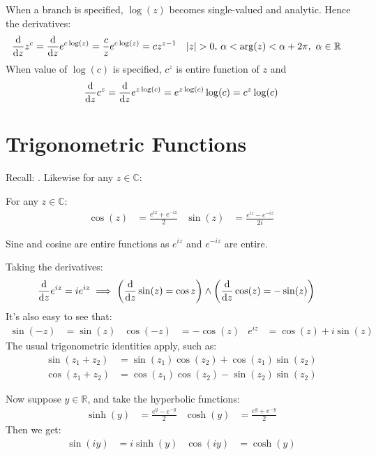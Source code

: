 \documentclass[12pt, english]{book}
\begin{document}
	When a branch is specified, \(\log(z)\) becomes single-valued and analytic. Hence the derivatives: 
	\begin{align*}
		\dv{z} z^c &= \dv{z} e^{c\log(z)} = \frac{c}{z} e^{c \log(z)} = cz^{z-1}
		& \abs{z}>0,& \ \alpha < \arg(z) < \alpha + 2 \pi, \ \alpha \in \mathbb{R}
	\end{align*}
	When value of \(\log(c)\) is specified, \(c^z\) is entire function of \(z\) and
	\begin{align*}
		\dv{z}c^z = \dv{z}e^{z\log(c)} = e^{z\log(c)} \log(c) = c^z \log(c)
	\end{align*}
	
	\section{Trigonometric Functions} \label{Trigonometric Functions Section - Complex}
	
	Recall: . Likewise for any \(z \in \mathbb{C}\):
	
	\begin{definition}
		 
		\label{Sine and Cosine Functions - Complex}
		For any \(z \in \mathbb{C}\):
		\begin{align*}
			\cos(z) &= \frac{e^{iz} + e^{-iz}}{2} &
			\sin(z) &= \frac{e^{iz} - e^{-iz}}{2i} 
		\end{align*}
	\end{definition}
	Sine and cosine are entire functions as \(e^{iz}\) and \(e^{-iz}\) are entire.
	
	Taking the derivatives:
	\begin{align*}
		\dv{z} e^{iz} = ie^{iz}
		&\implies \left(\dv{z} \sin(z) = \cos{z} \right) \land \left( \dv{z} \cos(z) = -\sin(z)\right)
	\end{align*}
	It's also easy to see that:
	\begin{align*}
		\sin(-z) &= \sin(z)  & \cos(-z) &= -\cos(z) & e^{iz} &= \cos(z) + i\sin(z)
	\end{align*}
	The usual trigonometric identities apply, such as: 
	\begin{align*}
		\sin(z_1 + z_2) &= \sin(z_1) \cos(z_2) + \cos(z_1) \sin(z_2) \\
		\cos(z_1 + z_2) &= \cos(z_1) \cos(z_2) - \sin(z_2) \sin(z_2)
	\end{align*}
	
	Now suppose \(y \in \mathbb{R}\), and take the hyperbolic functions:
	\begin{align*}
		\sinh(y) &= \frac{e^y - e^{-y}}{2} & \cosh(y) &= \frac{e^y + e^{-y}}{2}
	\end{align*}
	Then we get: 
	\begin{align*}
		\sin(iy) &= i\sinh(y) & \cos(iy) &= \cosh(y)
	\end{align*}
\end{document}
